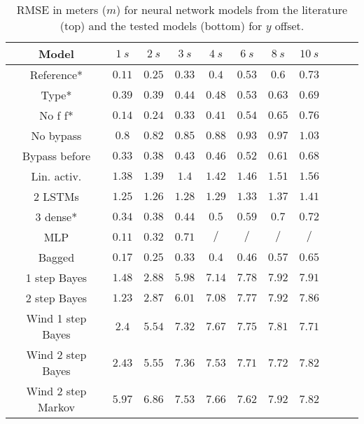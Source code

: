 \documentclass[preprint,12pt]{elsarticle}
\begin{document}
\begin{table}[!ht]
	\centering
    \begin{tabular}{|c|c|c|c|c|c|c|c|c|c|c|}
        \hline
        Model & $1 \ s$ & $2 \ s$ & $3 \ s$ & $4 \ s$ & $6 \ s$ & $8 \ s$ & $10 \ s$ \\ \hline
        Reference* & $\mathbf{0.11}$ & $0.25$ & $\mathbf{0.33}$ & $\mathbf{0.4}$ & $0.53$ & $0.6$ & $0.73$ \\ \hline
        Type* & $0.39$ & $0.39$ & $0.44$ & $0.48$ & $0.53$ & $0.63$ & $0.69$ \\ \hline
        No f f* & $0.14$ & $\mathbf{0.24}$ & $0.33$ & $0.41$ & $0.54$ & $0.65$ & $0.76$ \\ \hline
        No bypass & $0.8$ & $0.82$ & $0.85$ & $0.88$ & $0.93$ & $0.97$ & $1.03$ \\ \hline
        Bypass before & $0.33$ & $0.38$ & $0.43$ & $0.46$ & $0.52$ & $0.61$ & $0.68$ \\ \hline
        Lin. activ. & $1.38$ & $1.39$ & $1.4$ & $1.42$ & $1.46$ & $1.51$ & $1.56$ \\ \hline
        2 LSTMs & $1.25$ & $1.26$ & $1.28$ & $1.29$ & $1.33$ & $1.37$ & $1.41$ \\ \hline
        3 dense* & $0.34$ & $0.38$ & $0.44$ & $0.5$ & $0.59$ & $0.7$ & $0.72$ \\ \hline
        MLP \cite{liu2014vehicle} & $0.11$ & $0.32$ & $0.71$ & $/$ & $/$ & $/$ & $/$ \\ \hline
        Bagged & $0.17$ & $0.25$ & $0.33$ & $0.4$ & $\mathbf{0.46}$ & $\mathbf{0.57}$ & $\mathbf{0.65}$ \\ \hline
        1 step Bayes & $1.48$ & $2.88$ & $5.98$ & $7.14$ & $7.78$ & $7.92$ & $7.91$ \\ \hline
        2 step Bayes & $1.23$ & $2.87$ & $6.01$ & $7.08$ & $7.77$ & $7.92$ & $7.86$ \\ \hline
        Wind 1 step Bayes & $2.4$ & $5.54$ & $7.32$ & $7.67$ & $7.75$ & $7.81$ & $7.71$ \\ \hline
        Wind 2 step Bayes & $2.43$ & $5.55$ & $7.36$ & $7.53$ & $7.71$ & $7.72$ & $7.82$ \\ \hline
        Wind 2 step Markov & $5.97$ & $6.86$ & $7.53$ & $7.66$ & $7.62$ & $7.92$ & $7.82$ \\ \hline
    \end{tabular}
    \caption{RMSE in meters ($m$) for neural network models from the literature \cite{altche2017lstm, liu2014vehicle} (top) and the tested models (bottom) for $y$ offset.}
    \label{tab:lateral_position}
\end{table}
\end{document}
